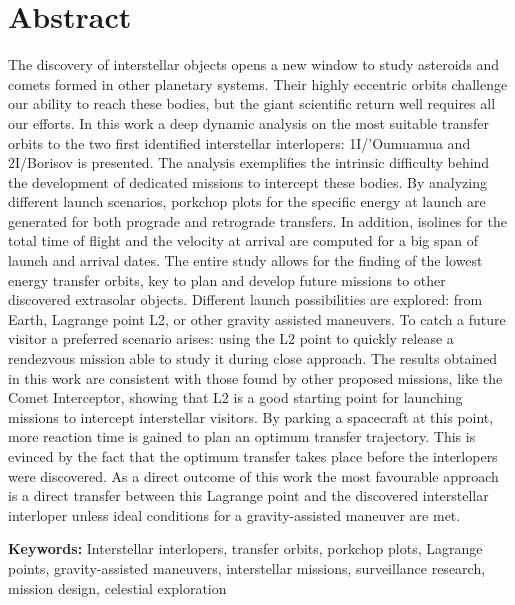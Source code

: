 \chapter*{Abstract}

The discovery of interstellar objects opens a new window to study asteroids and
comets formed in other planetary systems. Their highly eccentric orbits
challenge our ability to reach these bodies, but the giant scientific return
well requires all our efforts. In this work a deep dynamic analysis on the most
suitable transfer orbits to the two first identified interstellar interlopers:
1I/'Oumuamua and 2I/Borisov is presented. The analysis exemplifies the intrinsic
difficulty behind the development of dedicated missions to intercept these
bodies. By analyzing different launch scenarios, porkchop plots for the specific
energy at launch are generated for both prograde and retrograde transfers. In
addition, isolines for the total time of flight and the velocity at arrival are
computed for a big span of launch and arrival dates. The entire study allows for
the finding of the lowest energy transfer orbits, key to plan and develop future
missions to other discovered extrasolar objects. Different launch possibilities
are explored: from Earth, Lagrange point L2, or other gravity assisted
maneuvers. To catch a future visitor a preferred scenario arises: using the L2
point to quickly release a rendezvous mission able to study it during close
approach. The results obtained in this work are consistent with those found by
other proposed missions, like the Comet Interceptor, showing that L2 is a good
starting point for launching missions to intercept interstellar visitors. By
parking a spacecraft at this point, more reaction time is gained to plan an
optimum transfer trajectory. This is evinced by the fact that the optimum
transfer takes place before the interlopers were discovered. As a direct outcome
of this work the most favourable approach is a direct transfer between this
Lagrange point and the discovered interstellar interloper unless ideal
conditions for a gravity-assisted maneuver are met.

\vspace{4cm}
\textbf{Keywords:} Interstellar interlopers, transfer orbits, porkchop plots, Lagrange points,
gravity-assisted maneuvers, interstellar missions, surveillance research,
mission design, celestial exploration
